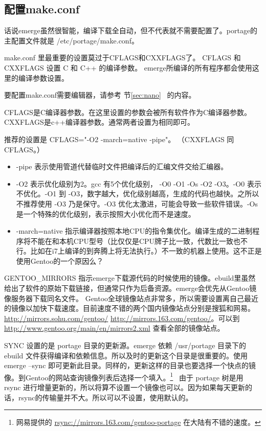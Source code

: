 \documentclass[amstex,twoside]{ctexbook}
\newcommand{\secref}[1]{节\ref{#1}~\nameref{#1}}
\begin{document}
\subsection{配置make.conf}

话说emerge虽然很智能，编译下载全自动，但不代表就不需要配置了。portage的主配置文件就是 /etc/portage/make.conf。

make.conf 里最重要的设置莫过于CFLAGS和CXXFLAGS了。 
CFLAGS 和 CXXFLAGS 设置 C 和 C++ 的编译参数。
emerge所编译的所有程序都会使用这里的编译参数设置。

要配置make.conf需要编辑器，请参考 \secref{sec:nano} %
的内容。

CFLAGS是C编译器参数。在这里设置的参数会被所有软件作为C编译器参数。CXXFLAGS是c++编译器参数。通常两者设置为相同即可。

推荐的设置是 CFLAGS="-O2 -march=native -pipe"。
（CXXFLAGS 同 CFLAGS。）

\begin{itemize}
\item -pipe 表示使用管道代替临时文件把编译后的汇编文件交给汇编器。
\item -O2 表示优化级别为2。gcc 有5个优化级别， -O0 -O1 -Os -O2 -O3。-O0 表示不优化。-O1 到 -O3，数字越大，优化级别越高，生成的代码也越快。之所以不推荐使用 -O3 乃是保守。-O3 优化太激进，可能会导致一些软件错误。-Os是一个特殊的优化级别，表示按照大小优化而不是速度。
\item -march=native 指示编译器按照本地CPU的指令集优化。编译生成的二进制程序将不能在和本机CPU型号（比仅仅是CPU牌子比一致，代数比一致也不行。比如在i7上编译的到奔腾上将无法执行。）不一致的机器上使用。这不正是使用Gentoo的一个原因么？
\end{itemize}


GENTOO\_MIRRORS 指示emerge下载源代码的时候使用的镜像。ebuild里虽然给出了软件的原始下载链接，但通常只作为后备资源。emerge会优先从Gentoo镜像服务器下载同名文件。
Gentoo全球镜像站点非常多，所以需要设置离自己最近的镜像以加快下载速度。目前速度不错的两个国内镜像站点分别是搜狐和网易。\url{http://mirrors.sohu.com/gentoo/} \url{http://mirrors.163.com/gentoo/}。可以到 \url{http://www.gentoo.org/main/en/mirrors2.xml} 查看全部的镜像站点。

SYNC %
设置的是 portage 目录的更新源。emerge 依赖 /usr/portage 目录下的 ebuild 文件获得编译和依赖信息。所以及时的更新这个目录是很重要的。使用 emerge --sync 
即可更新此目录。同样的，更新这样的目录也要选择一个快点的镜像。到Gentoo的网站查询镜像列表后选择一个填入。\footnote{网易提供的 \url{rsync://mirrors.163.com/gentoo-portage} 在大陆有不错的速度。}~ 由于 portage 树是用 rsync 进行增量更新的，所以将算不设置一个镜像也可以。因为如果每天更新的话，rsync的传输量并不大。所以可以不设置，使用默认的。
\end{document}
